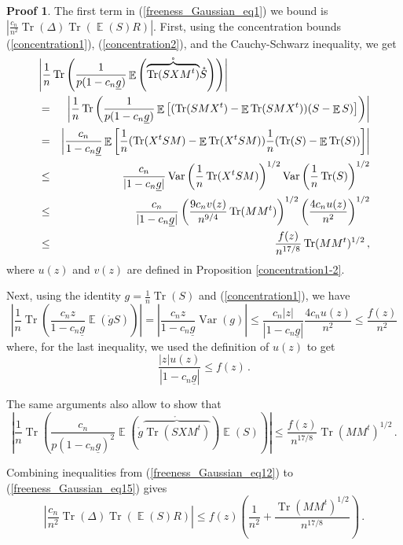 \documentclass[11pt,a4paper]{article}
\DeclareMathOperator{\E}{\mathbb{E}}
\DeclareMathOperator{\1}{\mathbf{1}}
\DeclareMathOperator{\Var}{\mathrm{Var}}
\DeclareMathOperator{\Tr}{\mathrm{Tr}}
\newcommand{\gbar}{\underline{g}}
\theoremstyle{definition}
\newtheorem*{Proof}{Proof}
\begin{document}
\begin{Proof}
The first term in (\ref{freeness_Gaussian_eq1}) we bound is $\left| \frac{c_n}{n^2} \Tr(\Delta) \Tr(\E(S)R) \right|$. First, using the concentration bounds (\ref{concentration1}), (\ref{concentration2}), and the Cauchy-Schwarz inequality, we get
\begin{eqnarray} \label{freeness_Gaussian_eq13}
\lefteqn{   \left| \frac1n \Tr \left( \frac{1}{p(1-c_n\gbar)} \E \left( \mathring{\overbrace{\Tr(SXM^t)}} \mathring{S} \right) \right) \right|   } \nonumber \\
& = & \left| \frac1n \Tr \left( \frac{1}{p(1-c_n\gbar)} \E \left[ (\Tr(SMX^t)-\E \Tr(SMX^t)) (S-\E S) \right] \right) \right| \nonumber \\
& = & \left| \frac{c_n}{1-c_n\gbar} \E\left[ \frac1n (\Tr(X^tSM)-\E \Tr(X^tSM)) \frac1n (\Tr(S)-\E \Tr(S)) \right] \right| \nonumber \\
& \le & \frac{c_n}{|1-c_n\gbar|} \Var \left( \frac1n \Tr(X^tSM) \right)^{1/2} \Var \left( \frac1n \Tr(S) \right)^{1/2} \nonumber \\
& \le & \frac{c_n}{|1-c_n\gbar|} \left( \frac{9c_n v(z)}{n^{9/4}} \Tr(MM^t) \right)^{1/2} \left( \frac{4c_n u(z)}{n^2} \right)^{1/2} \nonumber \\
& \le & \frac{f(z)}{n^{17/8}} \Tr(MM^t)^{1/2} \, ,
\end{eqnarray}
where $u(z)$ and $v(z)$ are defined in Proposition \ref{concentration1-2}.

Next, using the identity $g = \frac1n\Tr(S)$ and (\ref{concentration1}), we have
\begin{equation} \label{freeness_Gaussian_eq14}
\left| \frac1n \Tr \left( \frac{c_n z}{1-c_n\gbar} \E( \mathring{g}S ) \right) \right| = \left| \frac{c_n z}{1-c_n\gbar} \Var(g) \right| \le \frac{c_n |z|}{|1-c_n\gbar|} \frac{4c_n u(z)}{n^2} \le \frac{f(z)}{n^2}
\end{equation}
where, for the last inequality, we used the definition of $u(z)$ to get
\begin{displaymath}
\frac{|z| u(z)}{|1-c_n\gbar|} \le f(z) \, .
\end{displaymath}

The same arguments also allow to show that
\begin{equation} \label{freeness_Gaussian_eq15}
\left| \frac1n \Tr \left( \frac{c_n}{p(1-c_n\gbar)^2} \E \left( \mathring{g} \mathring{\overbrace{\Tr(SXM^t)}} \right) \E(S) \right) \right| \le \frac{f(z)}{n^{17/8}} \Tr(MM^t)^{1/2} \, .
\end{equation}

Combining inequalities from (\ref{freeness_Gaussian_eq12}) to (\ref{freeness_Gaussian_eq15}) gives
\begin{equation} \label{freeness_Gaussian_eq16}
\left| \frac{c_n}{n^2} \Tr(\Delta) \Tr(\E(S)R) \right| \le f(z) \left( \frac{1}{n^2} + \frac{\Tr(MM^t)^{1/2}}{n^{17/8}} \right) \, .
\end{equation}


\end{Proof}
\end{document}
